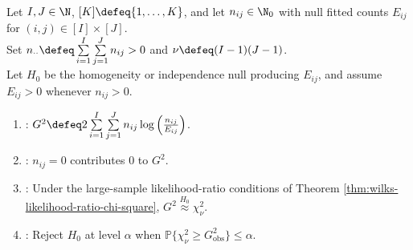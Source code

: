 \begin{method} \label{meth:categorical-likelihood-ratio-statistic} \\
Let $I,J\in\N$, $[K]\defeq\{1,\ldots,K\}$, and let $n_{ij}\in\N_0$ with null fitted counts $E_{ij}$ for $(i,j)\in[I]\times[J]$.\\
Set $n_{\cdot\cdot}\defeq\sum\limits_{i=1}^{I}\sum\limits_{j=1}^{J}n_{ij}>0$ and $\nu\defeq(I-1)(J-1)$.\\
Let $H_0$ be the homogeneity or independence null producing $E_{ij}$, and assume $E_{ij}>0$ whenever $n_{ij}>0$.
\begin{enumerate}[label=(\roman*)]
\setlength{\itemsep}{0pt}
\item {}: $G^2\defeq2\sum\limits_{i=1}^{I}\sum\limits_{j=1}^{J}n_{ij}\log\left(\frac{n_{ij}}{E_{ij}}\right)$.
\item {}: $n_{ij}=0$ contributes $0$ to $G^2$.
\item {}: Under the large-sample likelihood-ratio conditions of Theorem \ref{thm:wilks-likelihood-ratio-chi-square}, $G^2\overset{H_0}{\approx}\chi^2_{\nu}$.
\item {}: Reject $H_0$ at level $\alpha$ when $\mathbb{P}\{\chi^2_{\nu}\geq G^2_{\mathrm{obs}}\}\leq\alpha$.
\end{enumerate}
\end{method}
